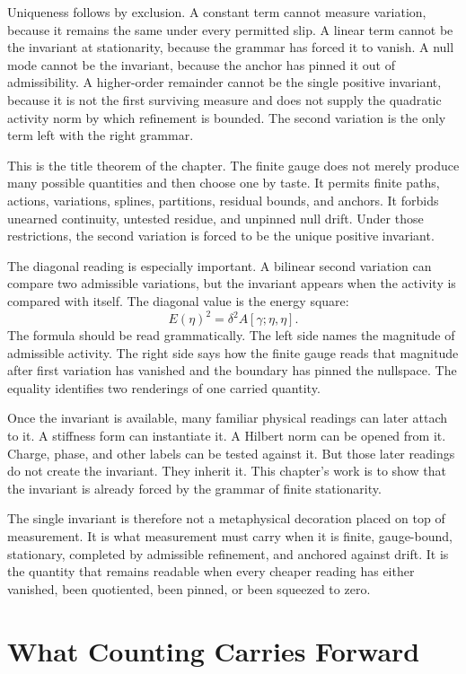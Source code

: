 Uniqueness follows by exclusion. A constant term cannot measure variation,
because it remains the same under every permitted slip. A linear term cannot
be the invariant at stationarity, because the grammar has forced it to
vanish. A null mode cannot be the invariant, because the anchor has pinned
it out of admissibility. A higher-order remainder cannot be the single
positive invariant, because it is not the first surviving measure and does
not supply the quadratic activity norm by which refinement is bounded. The
second variation is the only term left with the right grammar.

This is the title theorem of the chapter. The finite gauge does not merely
produce many possible quantities and then choose one by taste. It permits
finite paths, actions, variations, splines, partitions, residual bounds, and
anchors. It forbids unearned continuity, untested residue, and unpinned
null drift. Under those restrictions, the second variation is forced to be
the unique positive invariant.

The diagonal reading is especially important. A bilinear second variation
can compare two admissible variations, but the invariant appears when the
activity is compared with itself. The diagonal value is the energy square:
\[
  E(\eta)^2 = \delta^2 A[\gamma;\eta,\eta].
\]
The formula should be read grammatically. The left side names the magnitude
of admissible activity. The right side says how the finite gauge reads that
magnitude after first variation has vanished and the boundary has pinned
the nullspace. The equality identifies two renderings of one carried
quantity.

Once the invariant is available, many familiar physical readings can later
attach to it. A stiffness form can instantiate it. A Hilbert norm can be
opened from it. Charge, phase, and other labels can be tested against it.
But those later readings do not create the invariant. They inherit it. This
chapter's work is to show that the invariant is already forced by the
grammar of finite stationarity.

The single invariant is therefore not a metaphysical decoration placed on
top of measurement. It is what measurement must carry when it is finite,
gauge-bound, stationary, completed by admissible refinement, and anchored
against drift. It is the quantity that remains readable when every cheaper
reading has either vanished, been quotiented, been pinned, or been squeezed
to zero.

\section{What Counting Carries Forward}

